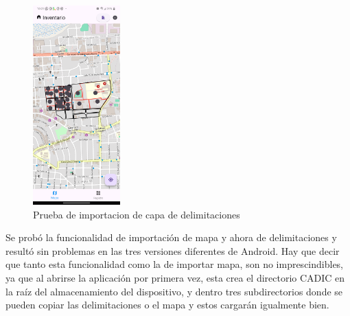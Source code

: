 \begin{figure}[h]
    \includegraphics[width=0.3\textwidth]{Graphics/Capitulo 4/LG Android 13/4.3/1.png}
    \caption{Prueba de importacion de capa de delimitaciones}
    \label{fig:figura19}
\end{figure}
Se probó la funcionalidad de importación de mapa y ahora de delimitaciones y resultó sin problemas en las tres versiones diferentes de Android. Hay que decir que tanto esta funcionalidad
como la de importar mapa, son no imprescindibles, ya que al abrirse la aplicación por primera vez, esta crea el directorio CADIC en la raíz del almacenamiento
del dispositivo, y dentro tres subdirectorios donde se pueden copiar las delimitaciones o el mapa y estos cargarán igualmente bien.

\pagebreak
